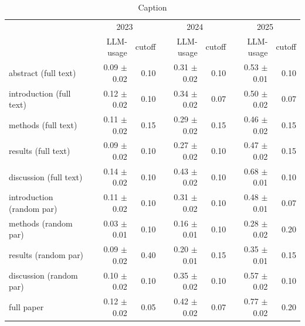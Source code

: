 \begin{table}[]
\centering
\begin{tabular}{lrrrrrr}
\toprule
 & \multicolumn{2}{c}{2023} & \multicolumn{2}{c}{2024} & \multicolumn{2}{c}{2025} \\
 & LLM-usage & cutoff & LLM-usage & cutoff & LLM-usage & cutoff \\
\midrule
\textcolor{abstract}{abstract (full text)}        & 0.09 $\pm$ 0.02 & 0.10 & 0.31 $\pm$ 0.02 & 0.10 & 0.53 $\pm$ 0.01 & 0.10 \\
\midrule
\textcolor{introduction}{introduction (full text)}    & 0.12 $\pm$ 0.02 & 0.10 & 0.34 $\pm$ 0.02 & 0.07 & 0.50 $\pm$ 0.02 & 0.07 \\
\textcolor{methods}{methods (full text)}         & 0.11 $\pm$ 0.02 & 0.15 & 0.29 $\pm$ 0.02 & 0.15 & 0.46 $\pm$ 0.02 & 0.15 \\
results (full text)         & 0.09 $\pm$ 0.02 & 0.10 & 0.27 $\pm$ 0.02 & 0.10 & 0.47 $\pm$ 0.02 & 0.15 \\
discussion (full text)      & 0.14 $\pm$ 0.02 & 0.10 & 0.43 $\pm$ 0.02 & 0.10 & 0.68 $\pm$ 0.01 & 0.10 \\
\midrule
introduction (random par)   & 0.11 $\pm$ 0.02 & 0.10 & 0.31 $\pm$ 0.02 & 0.10 & 0.48 $\pm$ 0.01 & 0.07 \\
methods (random par)        & 0.03 $\pm$ 0.01 & 0.10 & 0.16 $\pm$ 0.01 & 0.10 & 0.28 $\pm$ 0.02 & 0.20 \\
results (random par)        & 0.09 $\pm$ 0.02 & 0.40 & 0.20 $\pm$ 0.01 & 0.15 & 0.35 $\pm$ 0.01 & 0.15 \\
discussion (random par)     & 0.10 $\pm$ 0.02 & 0.10 & 0.35 $\pm$ 0.02 & 0.10 & 0.57 $\pm$ 0.02 & 0.10 \\
\midrule
full paper                  & 0.12 $\pm$ 0.02 & 0.05 & 0.42 $\pm$ 0.02 & 0.07 & 0.77 $\pm$ 0.02 & 0.20 \\
\bottomrule
\end{tabular}
\caption{Caption}
    \label{tab:LLM-estimate_ind_cutoff}
\end{table}

